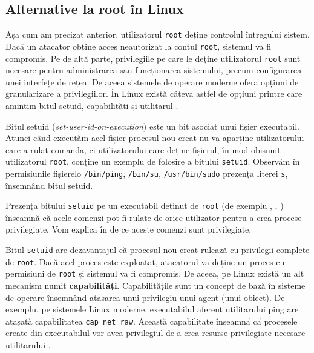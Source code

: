 \subsection{Alternative la root în Linux}
\label{sec:user:altroot}

Așa cum am precizat anterior, utilizatorul \texttt{root} deține controlul întregului
sistem. Dacă un atacator obține acces neautorizat la contul \texttt{root}, sistemul va fi
compromis. Pe de altă parte, privilegiile pe care le deține utilizatorul \texttt{root}
sunt necesare pentru administrarea sau funcționarea sistemului, precum
configurarea unei interfețe de rețea. De aceea sistemele de operare moderne oferă
opțiuni de granularizare a privilegiilor. În Linux există câteva astfel de
opțiuni printre care amintim bitul setuid, capabilități și utilitarul .

Bitul setuid (\textit{set-user-id-on-execution}) este un bit asociat unui fișier
executabil. Atunci când executăm acel fișier procesul nou creat nu va aparține
utilizatorului care a rulat comanda, ci utilizatorului care deține fișierul, în
mod obișnuit utilizatorul \texttt{root}.  conține un exemplu de
folosire a bitului \texttt{setuid}. Observăm în permisiunile fișierelo \texttt{/bin/ping}, \texttt{/bin/su}, \texttt{/usr/bin/sudo} prezența literei \texttt{s}, însemnând bitul setuid.


Prezența bitului \texttt{setuid} pe un executabil deținut de \texttt{root} (de exemplu , ,
) înseamnă că acele comenzi pot fi rulate de orice utilizator pentru a crea
procese privilegiate. Vom explica în 
de ce aceste comenzi sunt privilegiate.

Bitul \texttt{setuid} are dezavantajul că procesul nou creat rulează cu privilegii
complete de \texttt{root}. Dacă acel proces este exploatat, atacatorul va deține un
proces cu permisiuni de \texttt{root} și sistemul va fi compromis. De aceea, pe Linux
există un alt mecanism numit \textbf{capabilități}. Capabilitățile sunt un concept de
bază în sisteme de operare însemnând atașarea unui privilegiu
unui agent (unui obiect). De exemplu, pe sistemele Linux moderne, executabilul
aferent utilitarului ping are atașată capabilitatea \texttt{cap\_net\_raw}. Această
capabilitate înseamnă că procesele create din executabilul  vor avea
privilegiul de a crea resurse privilegiate necesare utilitarului .

